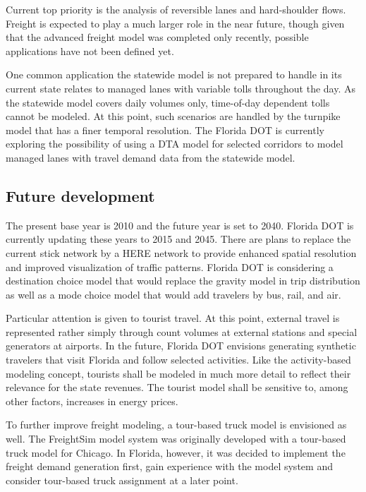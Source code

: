 Current top priority is the analysis of reversible lanes and hard-shoulder flows. Freight is expected to play a much larger role in the near future, though given that the advanced freight model was completed only recently, possible applications have not been defined yet.

One common application the statewide model is not prepared to handle in its current state relates to managed lanes with variable tolls  throughout the day. As the statewide model covers daily volumes only, time-of-day dependent tolls cannot be modeled. At this point, such scenarios are handled by the turnpike model that has a finer temporal resolution. The Florida DOT is currently exploring the possibility of using a DTA model for selected corridors to model managed lanes with travel demand data from the statewide model.

\subsection{Future development}

The present base year is 2010 and the future year is set to 2040. Florida DOT is currently updating these years to 2015 and 2045. There are plans to replace the current stick network by a HERE network to provide enhanced spatial resolution and improved visualization of traffic patterns. Florida DOT is considering a destination choice model that would replace the gravity model in trip distribution as well as a mode choice model that would add travelers by bus, rail, and air.

Particular attention is given to tourist travel. At this point, external travel is represented rather simply through count volumes at external stations and special generators at airports. In the future, Florida DOT envisions generating synthetic travelers that visit Florida and follow selected activities. Like the activity-based modeling concept, tourists shall be modeled in much more detail to reflect their relevance for the state revenues. The tourist model shall be sensitive to, among other factors, increases in energy prices.

To further improve freight modeling, a tour-based truck model is envisioned as well. The FreightSim model system was originally developed with a tour-based truck model for Chicago. In Florida, however, it was decided to implement the freight demand generation first, gain experience with the model system and consider tour-based truck assignment at a later point.

